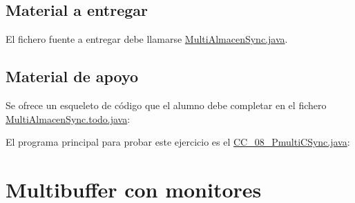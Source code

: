 \documentclass{article}
\begin{document}
\subsection*{Material a entregar}
El fichero fuente a entregar debe llamarse \url{MultiAlmacenSync.java}.

\subsection*{Material de apoyo}
Se ofrece un esqueleto de código que el alumno debe completar en el fichero
\url{MultiAlmacenSync.todo.java}:


El programa principal para probar este ejercicio es el
\url{CC_08_PmultiCSync.java}: 


\clearpage

\section{Multibuffer con monitores}




\end{document}
